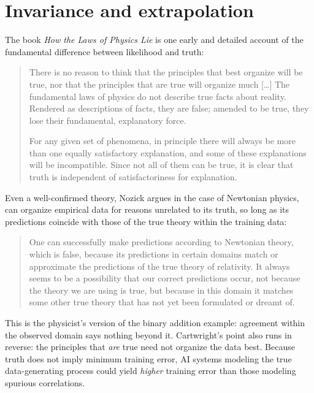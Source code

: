 \section{Invariance and extrapolation}\label{sec:philosophy}

The book \emph{How the Laws of Physics Lie} \citep{cartwright1983} is one early and detailed account of the fundamental difference between likelihood and truth:
\begin{quote}
There is no reason to think that the principles that best organize will be true, nor that the principles that are true will organize much [\ldots] The fundamental laws of physics do not describe true facts about reality. Rendered as descriptions of facts, they are false; amended to be true, they lose their fundamental, explanatory force.~\citep[pp. 53--54]{cartwright1983}

For any given set of phenomena, in principle there will always be more than one equally satisfactory explanation, and some of these explanations will be incompatible. Since not all of them can be true, it is clear that truth is independent of satisfactoriness for explanation.~\citep[p. 90]{cartwright1983}
\end{quote}

Even a well-confirmed theory, Nozick argues in the case of Newtonian physics, can organize empirical data for reasons unrelated to its truth, so long as its predictions coincide with those of the true theory within the training data:

\begin{quote}
One can successfully make predictions according to Newtonian theory, which is false, because its predictions in certain domains match or approximate the predictions of the true theory of relativity. It always seems to be a possibility that our correct predictions occur, not because the theory we are using is true, but because in this domain it matches some other true theory that has not yet been formulated or dreamt of.~\citep[p. 51]{nozick2001}
\end{quote}

This is the physicist's version of the binary addition example: agreement within the observed domain says nothing beyond it. Cartwright's point also runs in reverse: the principles that \emph{are} true need not organize the data best. Because truth does not imply minimum training error, AI systems modeling the true data-generating process could yield \emph{higher} training error than those modeling spurious correlations.

